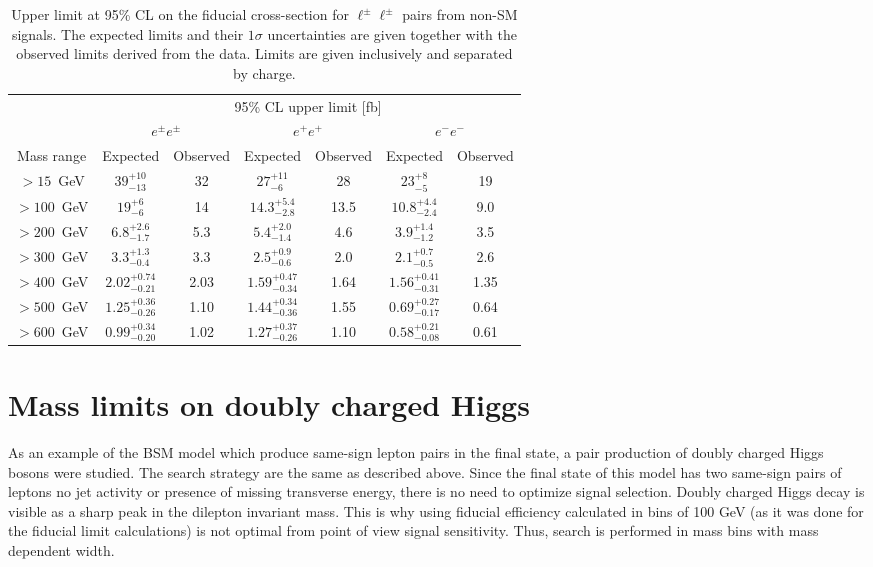 \begin{table*}[!ht]
\begin{center}
\begin{tabular}{c||c|c||c|c||c|c}

 & \multicolumn{6}{c}{95\%  CL upper limit [fb]} \\
 & \multicolumn{2}{c||}{$e^{\pm}e^{\pm}$} & \multicolumn{2}{c||}{$e^{+}e^{+}$} & \multicolumn{2}{c}{$e^{-}e^{-}$} \\
Mass range & Expected & Observed & Expected & Observed & Expected & Observed \\
\hline
\rule{0pt}{3ex}
  $>15$~GeV   &  $39^{+10}_{-13}$        &  32    &    $27^{+11}_{-6}$         &  28    &    $23^{+8}_{-5}$          &  19\\
  $>100$~GeV  &  $19^{+6}_{-6}$          &  14    &    $14.3^{+5.4}_{-2.8}$    &  13.5  &    $10.8^{+4.4}_{-2.4}$    &  9.0\\
  $>200$~GeV  &  $6.8^{+2.6}_{-1.7}$     &  5.3   &    $5.4^{+2.0}_{-1.4}$     &  4.6   &    $3.9^{+1.4}_{-1.2}$     &  3.5\\
  $>300$~GeV  &  $3.3^{+1.3}_{-0.4}$     &  3.3   &    $2.5^{+0.9}_{-0.6}$     &  2.0   &    $2.1^{+0.7}_{-0.5}$     &  2.6\\
  $>400$~GeV  &  $2.02^{+0.74}_{-0.21}$  &  2.03  &    $1.59^{+0.47}_{-0.34}$  &  1.64  &    $1.56^{+0.41}_{-0.31}$  &  1.35\\
  $>500$~GeV  &  $1.25^{+0.36}_{-0.26}$  &  1.10  &    $1.44^{+0.34}_{-0.36}$  &  1.55  &    $0.69^{+0.27}_{-0.17}$  &  0.64\\
  $>600$~GeV  &  $0.99^{+0.34}_{-0.20}$  &  1.02  &    $1.27^{+0.37}_{-0.26}$  &  1.10  &    $0.58^{+0.21}_{-0.08}$  &  0.61\\

\end{tabular}
\end{center}
 \caption{Upper limit at 95\% CL on the fiducial cross-section for $\ell^{\pm} \ell^{\pm}$ pairs from non-SM signals. The expected limits and their $1 \sigma$ uncertainties are given together with the observed limits derived from the data. Limits are given inclusively and separated by charge.}
\label{tab:limits}
\end{table*}


\section{Mass limits on doubly charged Higgs}
As an example of the BSM model which produce same-sign lepton pairs in the final state, a pair production of doubly charged Higgs bosons were studied.
The search strategy are the same as described above.
Since the final state of this model has two same-sign pairs of leptons no jet activity or presence of missing transverse energy, 
there is no need to optimize signal selection.
Doubly charged Higgs decay is visible as a sharp peak in the dilepton invariant mass.
This is why using fiducial efficiency calculated in bins of 100 GeV (as it was done for the fiducial limit calculations) is not optimal from point of view signal sensitivity.
Thus, search is performed in mass bins with mass dependent width.

